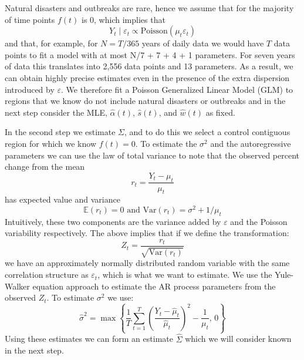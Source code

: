 \documentclass[11pt]{article}
\begin{document}
Natural disasters and outbreaks are rare, hence we assume that for the majority of time points $f(t)$ is 0, which implies that 
\begin{equation*}
    Y_t \mid \varepsilon_t \propto \mbox{Poisson}(\mu_t  \varepsilon_t )
\end{equation*}
and that, for example, for $N = T / 365$ years of daily data we would have $T$ data points to fit a model with at most N/7 + 7 + 4 + 1 parameters. For seven years of data this translates into 2,556 data points and 13 parameters. As a result, we can obtain highly precise estimates even in the presence of the extra dispersion introduced by $\varepsilon$. We therefore fit a Poisson Generalized Linear Model (GLM) to regions that we know do not include natural disasters or outbreaks and in the next step consider the MLE, $\hat{\alpha}(t)$, $\hat{s}(t)$, and $\hat{w}(t)$ as fixed.

In the second step we estimate $\Sigma$, and to do this we select a control contiguous region for which we know $f(t)=0$. To estimate the $\sigma^2$ and the autoregressive parameters we can use the law of total variance to note that the observed percent change from the mean
\begin{equation*}
    r_t = \frac{Y_t - \mu_t}{\mu_t}
\end{equation*}
has expected value and variance
\begin{equation*}
    \mathbb{E}\left(r_t \right) = 0 \mbox{ and } \mbox{Var}\left(r_t\right)= \sigma^2 + 1/\mu_t
\end{equation*}
Intuitively, these two components are the variance added by $\varepsilon$ and the Poisson variability respectively. The above implies that if we define the transformation:
\begin{equation*}
    Z_t = \frac{r_t}{\sqrt{\mbox{Var}\left(r_t\right)}}
\end{equation*}
we have an approximately normally distributed random variable with the same correlation structure as $\varepsilon_t$, which is what we want to estimate. We use the Yule-Walker equation approach to estimate the AR process parameters from the observed $Z_t$. To estimate $\sigma^2$ we use:
\begin{equation*}
    \hat{\sigma}^2 = \max\left\{ \frac{1}{T}\sum_{t=1}^T  \left(\frac{Y_t - \hat{\mu}_t}{\hat{\mu}_t}\right)^2  - \frac{1}{\mu_t}, \, 0\right\}
\end{equation*}
Using these estimates we can form an estimate $\hat{\Sigma}$ which we will consider known in the next step.
\end{document}
